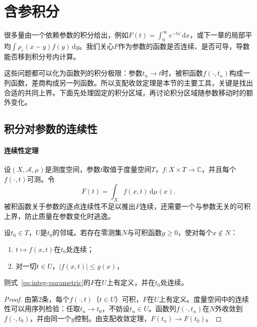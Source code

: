 \section{含参积分}
\label{sec:integ-parametric}

很多量由一个依赖参数的积分给出，例如$F(t)=\int_0^\infty e^{-tx}\,\mathrm dx$，或下一章的局部平均$\int\rho_\varepsilon(x-y)f(y)\,\mathrm dy$。我们关心$F$作为参数的函数是否连续、是否可导，导数能否移到积分号内计算。

这些问题都可以化为函数列的积分极限：参数$t_n\to t$时，被积函数$f(\cdot,t_n)$构成一列函数，差商构成另一列函数。所以支配收敛定理是本节的主要工具，关键是找出合适的共同上界。下面先处理固定的积分区域，再讨论积分区域随参数移动时的额外变化。

\subsection{积分对参数的连续性}
\label{sec:integ-parameter-continuity}

\paragraph{连续性定理}
设$(X,\mathcal A,\mu)$是测度空间，参数$t$取值于度量空间$T$，$f:X\times T\to\mathbb C$，并且每个$f(\cdot,t)$可测。令
\begin{equation}
 F(t)=\int_Xf(x,t)\,\mathrm d\mu(x).
 \label{eq:integ-parametric}
\end{equation}
被积函数关于参数的逐点连续性不足以推出$F$连续，还需要一个与参数无关的可积上界，防止质量在参数变化时逃逸。

\begin{theorem}[含参积分的连续性]
\label{thm:integ-parameter-continuity}
设$t_0\in T$，$U$是$t_0$的邻域。若存在零测集$N$与可积函数$g\geq0$，使对每个$x\notin N$：
\begin{enumerate}
 \item $t\mapsto f(x,t)$在$t_0$处连续；
 \item 对一切$t\in U$，$\lvert f(x,t)\rvert\leq g(x)$，
\end{enumerate}
则式~\eqref{eq:integ-parametric}的$F$在$U$上有定义，并在$t_0$处连续。
\end{theorem}

\begin{proof}
由第2条，每个$f(\cdot,t)$（$t\in U$）可积，$F$在$U$上有定义。度量空间中的连续性可以用序列检验：任取$t_n\to t_0$，不妨设$t_n\in U$。函数列$f(\cdot,t_n)$在$N$外收敛到$f(\cdot,t_0)$，并由同一个$g$控制。由支配收敛定理，$F(t_n)\to F(t_0)$。
\end{proof}

